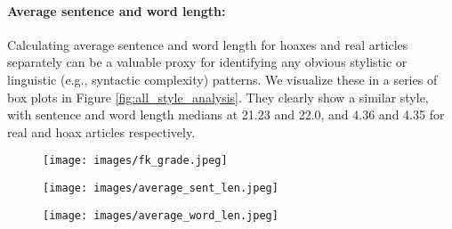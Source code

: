 \noindent\paragraph{\textbf{Average sentence and word length:}} Calculating average sentence and word length for hoaxes and real articles separately can be a valuable proxy for identifying any obvious stylistic or linguistic (e.g., syntactic complexity) patterns. We visualize these in a series of box plots in Figure \ref{fig:all_style_analysis}. They clearly show a similar style, with  sentence and word length medians at 21.23 and 22.0, and 4.36 and 4.35 for real and hoax articles respectively. 
\begin{comment}
\begin{figure*}
    \centering
    \texttt{[image: images/all\_box\_f1.png]}
    \caption{Results of different stylistic analyses on Hoax (red) and Real (blue) articles.}
    \label{fig:all_style_analysis}
\end{figure*}
\end{comment}

\begin{figure*}
    \centering
    \begin{subfigure}{.33\linewidth}
        \centering
        \texttt{[image: images/fk\_grade.jpeg]}
        \label{fig:fk_grade}
    \end{subfigure}\hfill
    \begin{subfigure}{.33\linewidth}
        \centering
        \texttt{[image: images/average\_sent\_len.jpeg]}
        \label{fig:average_sent_len}
    \end{subfigure}\hfill
    \begin{subfigure}{.33\linewidth}
        \centering
        \texttt{[image: images/average\_word\_len.jpeg]}
        \label{fig:average_word_len}
    \end{subfigure}
    \caption{Results of different stylistic analyses on Hoax (red) and Real (blue) articles.}
    \label{fig:all_style_analysis}
\end{figure*}




